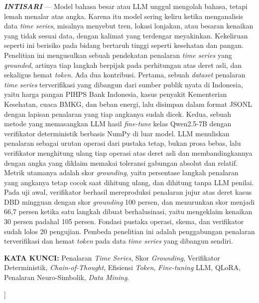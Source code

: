 \documentclass[10pt,a4paper,twocolumn]{article}
\begin{document}
{\begin{@twocolumnfalse}
{\small\justifying
\noindent\textbf{\textit{INTISARI}} --- Model bahasa besar atau LLM unggul
mengolah bahasa, tetapi lemah menalar atas angka. Karena itu model sering
keliru ketika menganalisis data \textit{time series}, misalnya menyebut tren,
lokasi lonjakan, atau besaran kenaikan yang tidak sesuai data, dengan kalimat
yang terdengar meyakinkan. Kekeliruan seperti ini berisiko pada bidang
bertaruh tinggi seperti kesehatan dan pangan. Penelitian ini mengusulkan
sebuah pendekatan penalaran \textit{time series} yang \textit{grounded},
artinya tiap langkah berpijak pada perhitungan atas deret asli, dan sekaligus
hemat \textit{token}. Ada dua kontribusi. Pertama, sebuah \textit{dataset}
penalaran \textit{time series} terverifikasi yang dibangun dari sumber publik
nyata di Indonesia, yaitu harga pangan PIHPS Bank Indonesia, kasus penyakit
Kementerian Kesehatan, cuaca BMKG, dan beban energi, lalu disimpan dalam
format JSONL dengan lapisan penalaran yang tiap angkanya sudah dicek. Kedua,
sebuah metode yang memasangkan LLM hasil \textit{fine-tune} kelas Qwen2.5-7B
dengan verifikator deterministik berbasis NumPy di luar model. LLM menuliskan
penalaran sebagai urutan operasi dari pustaka tetap, bukan prosa bebas, lalu
verifikator menghitung ulang tiap operasi atas deret asli dan membandingkannya
dengan angka yang diklaim memakai toleransi gabungan absolut dan relatif.
Metrik utamanya adalah skor \textit{grounding}, yaitu persentase langkah
penalaran yang angkanya tetap cocok saat dihitung ulang, dan dihitung tanpa
LLM penilai. Pada uji awal, verifikator berhasil mereproduksi penalaran jujur
atas deret kasus DBD mingguan dengan skor \textit{grounding} 100 persen, dan
menurunkan skor menjadi 66,7 persen ketika satu langkah dibuat berhalusinasi,
yaitu mengeklaim kenaikan 30 persen padahal 105 persen. Fondasi pustaka
operasi, skema, dan verifikator sudah lolos 20 pengujian. Pembeda penelitian
ini adalah penggabungan penalaran terverifikasi dan hemat \textit{token} pada
data \textit{time series} yang dibangun sendiri.
\par\vspace{0.7em}
\noindent\textbf{KATA KUNCI:} Penalaran \textit{Time Series}, Skor
\textit{Grounding}, Verifikator Deterministik, \textit{Chain-of-Thought},
Efisiensi \textit{Token}, \textit{Fine-tuning} LLM, QLoRA, Penalaran
Neuro-Simbolik, \textit{Data Mining}.
\par}
\vspace{1.5em}
\end{@twocolumnfalse}
}]

\justifying
\end{document}
